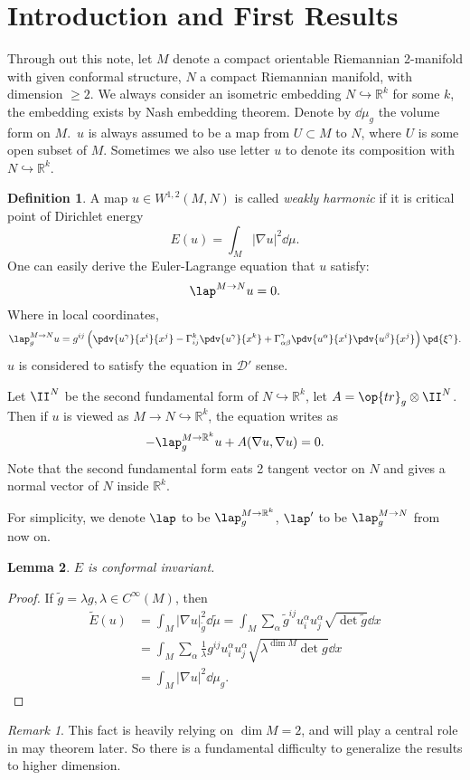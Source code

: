 \documentclass[UTF8,12pt]{article}
\theoremstyle{plain}\newtheorem{theorem}{Theorem}
\theoremstyle{definition}\newtheorem{definition}[theorem]{Definition}
\theoremstyle{definition}\newtheorem{example}[theorem]{Example}
\theoremstyle{plain}\newtheorem{axiom}[theorem]{Axiom}
\theoremstyle{plain}\newtheorem{assertion}[theorem]{Assertion}
\theoremstyle{plain}\newtheorem{corollary}[theorem]{Corollary}
\theoremstyle{plain}\newtheorem{lemma}[theorem]{Lemma}
\theoremstyle{plain}\newtheorem{proposition}[theorem]{Proposition}
\theoremstyle{plain}\newtheorem{prop}[theorem]{Proposition}
\theoremstyle{plain}\newtheorem{conjecture}[theorem]{Conjecture}
\theoremstyle{plain}\newtheorem{conj}[theorem]{Conjecture}
\theoremstyle{plain}\newtheorem{problem}[theorem]{Problem}
\theoremstyle{remark}\newtheorem{notation}[theorem]{Notation}
\theoremstyle{definition}\newtheorem*{question}{Question}
\theoremstyle{definition}\newtheorem*{answer}{Answer}
\theoremstyle{definition}\newtheorem*{goal}{Goal}
\theoremstyle{plain}\newtheorem*{application}{Application}
\theoremstyle{plain}\newtheorem*{exercise}{Exercise}
\theoremstyle{remark}\newtheorem*{remark}{Remark}
\theoremstyle{remark}\newtheorem*{note}{\small{Note}}
\numberwithin{equation}{section}
\numberwithin{theorem}{section}
\numberwithin{figure}{section}
\begin{document}
\section{Introduction and First Results}
Through out this note, let \(M\) denote a compact orientable Riemannian 2-manifold with
given conformal structure, \(N\) a compact Riemannian manifold, with dimension \(\ge
2\). We always consider an isometric embedding \(N\hookrightarrow\mathbb{R}^k\) for
some \(k\), the embedding exists by Nash embedding theorem. Denote by \(\dd{\mu_g}\)
the volume form on \(M\).\ \(u\) is always assumed to be a map from \(U\subset M\) to
\(N\), where \(U\) is some open subset of \(M\). Sometimes we also use letter \(u\) to
denote its composition with \(N\hookrightarrow\mathbb{R}^k\).

\begin{definition}
    A map \(u\in W^{1,2}(M,N)\) is called \emph{weakly harmonic} if it is critical
    point of Dirichlet energy \[
        E(u)=\int_{M}|\nabla u|^2\dd{\mu}
    .\] One can easily derive the Euler-Lagrange equation that \(u\) satisfy: \[
        \lap^{M\to N} u=0
    .\] Where in local coordinates, \[
        \lap_g^{M\to N} u=g^{ij}\left(\pdv{u^\gamma}{x^i}{x^j}
        -\Gamma_{ij}^k\pdv{u^\gamma}{x^k}
        +\Gamma_{\alpha\beta}^\gamma\pdv{u^\alpha}{x^i}\pdv{u^\beta}{x^j}\right)
        \pd{\xi^\gamma}
    .\] \(u\) is considered to satisfy the equation in \(\mathcal{D}'\) sense.
\end{definition}
Let \(\II^N\) be the second fundamental form of \(N\hookrightarrow\mathbb{R}^k\),
let \(A=\op{tr}_g\otimes\II^N\). Then if \(u\) is viewed as \(M\to N\hookrightarrow
\mathbb{R}^k\), the equation writes as \[
    -\lap_g^{M\to\mathbb{R}^k} u+A(\nabla u,\nabla u)=0
.\] Note that the second fundamental form eats 2 tangent vector on \(N\) and gives
a normal vector of \(N\) inside \(\mathbb{R}^k\).

For simplicity, we denote \(\lap\) to be \(\lap_g^{M\to \mathbb{R}^k}\),
\(\lap'\) to be \(\lap_g^{M\to N}\) from now on.

\begin{lemma}
    \(E\) is conformal invariant.
\end{lemma}
\begin{proof}
    If \(\tilde{g}=\lambda g,\lambda\in C^\infty(M)\), then
    \begin{align*}
        \tilde{E}(u)&=\int_{M}|\nabla u|_{\tilde{g}}^2\dd{\tilde{\mu}}
        =\int_{M}\sum_\alpha\tilde{g}^{ij}u^{\alpha}_i u^\alpha_j
        \sqrt{\det\tilde{g}}\dd{x} \\
        &=\int_{M}\sum_\alpha \frac{1}{\lambda}g^{ij}u_i^\alpha u_j^\alpha
        \sqrt{\lambda^{\dim M}\det g}\dd{x} \\
        &=\int_{M}|\nabla u|^2\dd{\mu_g}
    .\end{align*}
\end{proof}
\begin{remark}
    This fact is heavily relying on \(\dim M=2\), and will play a central role in
    may theorem later. So there is a fundamental difficulty to generalize the results
    to higher dimension.
\end{remark}
\end{document}
